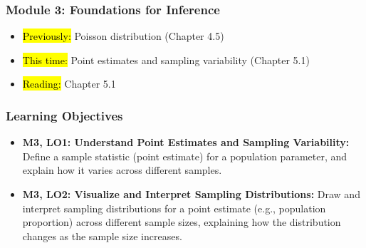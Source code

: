 
\begin{frame}
    \frametitle{Module 3: Foundations for Inference}
    \begin{itemize}
        \item \hl{Previously: }Poisson distribution (Chapter 4.5)
        \item \hl{This time: }Point estimates and sampling variability (Chapter 5.1)
        \item \hl{Reading: }Chapter 5.1
    \end{itemize}

\end{frame}
\begin{frame}
    \frametitle{Learning Objectives}
    \begin{itemize}
        \item \textbf{M3, LO1: Understand Point Estimates and Sampling Variability:} Define a sample statistic (point estimate) for a population parameter, and explain how it varies across different samples.
        \item \textbf{M3, LO2: Visualize and Interpret Sampling Distributions:} Draw and interpret sampling distributions for a point estimate (e.g., population proportion) across different sample sizes, explaining how the distribution changes as the sample size increases.
    \end{itemize}
\end{frame}
